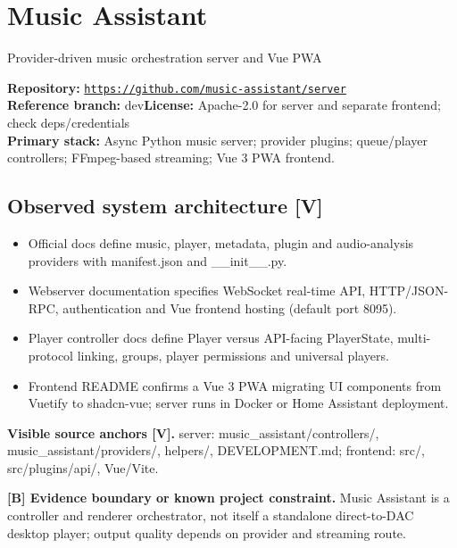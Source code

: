 \documentclass[10pt,a4paper,oneside]{report}
\newcommand{\tagboundary}{\textbf{[B] Evidence boundary or known project constraint.}}
\newcommand{\sourceurl}[1]{\href{#1}{\texttt{\nolinkurl{#1}}}}
\begin{document}
\chapter{Music Assistant}
{\large\color{muted}Provider-driven music orchestration server and Vue PWA}\par
\begin{evidencebox}\small\textbf{Repository:} \sourceurl{https://github.com/music-assistant/server}\\\textbf{Reference branch:} dev\qquad \textbf{License:} Apache-2.0 for server and separate frontend; check deps/credentials\\\textbf{Primary stack:} Async Python music server; provider plugins; queue/player controllers; FFmpeg-based streaming; Vue 3 PWA frontend.\end{evidencebox}
\section{Observed system architecture [V]}
\begin{itemize}[leftmargin=*,itemsep=2pt,topsep=3pt]
\item Official docs define music, player, metadata, plugin and audio-analysis providers with manifest.json and \_\_init\_\_.py.
\item Webserver documentation specifies WebSocket real-time API, HTTP/JSON-RPC, authentication and Vue frontend hosting (default port 8095).
\item Player controller docs define Player versus API-facing PlayerState, multi-protocol linking, groups, player permissions and universal players.
\item Frontend README confirms a Vue 3 PWA migrating UI components from Vuetify to shadcn-vue; server runs in Docker or Home Assistant deployment.
\end{itemize}
\textbf{Visible source anchors [V].} server: music\_assistant/controllers/, music\_assistant/providers/, helpers/, DEVELOPMENT.md; frontend: src/, src/plugins/api/, Vue/Vite.\par
\begin{evidencebox}\tagboundary{} Music Assistant is a controller and renderer orchestrator, not itself a standalone direct-to-DAC desktop player; output quality depends on provider and streaming route.\end{evidencebox}
\end{document}
